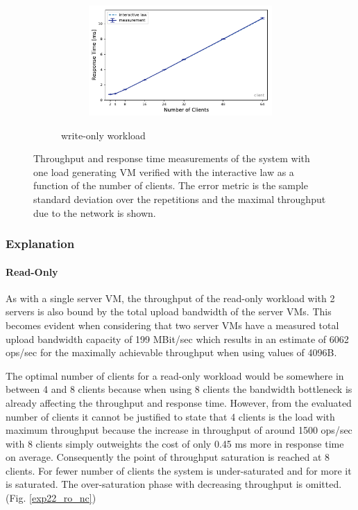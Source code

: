 \documentclass[report.tex]{subfiles}
\begin{document}
\begin{figure}[H]
\begin{subfigure}{\linewidth}
\begin{subfigure}[b]{.49\linewidth}
	\end{subfigure}\hfill
	\begin{subfigure}[b]{.49\linewidth}
		\centering
		\includegraphics[width=\linewidth]{data/exp22_wo_rt_nc.pdf}
	\end{subfigure}%
	\caption{write-only workload}
	\label{exp22_wo_nc}
\end{subfigure}
\caption{Throughput and response time measurements of the system with one load generating VM verified with the interactive law as a function of the number of clients. The error metric is the sample standard deviation over the repetitions and the maximal throughput due to the network is shown.}
\end{figure}



\subsubsection{Explanation}

\paragraph{Read-Only}
As with a single server VM, the throughput of the read-only workload with 2 servers is also bound by the total upload bandwidth of the server VMs. This becomes evident when considering that two server VMs have a measured total upload bandwidth capacity of 199 MBit/sec which results in an estimate of 6062 ops/sec for the maximally achievable throughput when using values of 4096B.

The optimal number of clients for a read-only workload would be somewhere in between 4 and 8 clients because when using 8 clients the bandwidth bottleneck is already affecting the throughput and response time. However, from the evaluated number of clients it cannot be justified to state that 4 clients is the load with maximum throughput because the increase in throughput of around 1500 ops/sec with 8 clients simply outweights the cost of only 0.45 ms more in response time on average. Consequently the point of throughput saturation is reached at 8 clients. For fewer number of clients the system is under-saturated and for more it is saturated. The over-saturation phase with decreasing throughput is omitted. (Fig. \ref{exp22_ro_nc})
\end{document}

